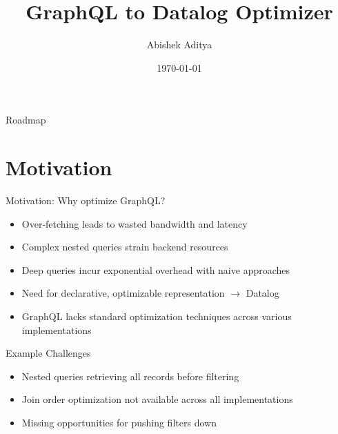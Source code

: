 \documentclass{beamer}
\title{GraphQL to Datalog Optimizer}
\author{Abishek Aditya}
\institute{CSE505 Spring 2025}
\date{\today}
\begin{document}
\maketitle

\begin{frame}{Roadmap}
  \tableofcontents[hideallsubsections]
\end{frame}

\section{Motivation}
\begin{frame}{Motivation: Why optimize GraphQL?}
  \begin{itemize}
    \item Over-fetching leads to wasted bandwidth and latency
    \item Complex nested queries strain backend resources
    \item Deep queries incur exponential overhead with naive approaches
    \item Need for declarative, optimizable representation $\rightarrow$ \alert{Datalog}
    \item GraphQL lacks standard optimization techniques across various implementations
  \end{itemize}
  
  \begin{block}{Example Challenges}
    \begin{itemize}
      \item Nested queries retrieving all records before filtering
      \item Join order optimization not available across all implementations
      \item Missing opportunities for pushing filters down
    \end{itemize}
  \end{block}
\end{frame}

\end{document}
